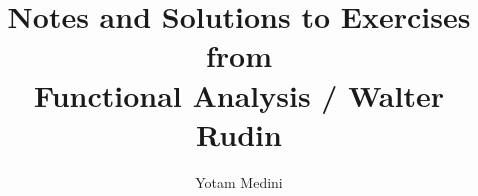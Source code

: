 \newcommand{\C}{\ensuremath{\mathbb{C}}} %
\newcommand{\calB}{\ensuremath{\mathcal{B}}}
\newcommand{\calG}{\ensuremath{\mathcal{G}}}
\newcommand{\scrD}{\ensuremath{\mathscr{D}}}
\newcommand{\scrP}{\ensuremath{\mathscr{P}}}
\newcommand{\scrQ}{\ensuremath{\mathscr{Q}}}
\newcommand{\Lp}[1]{\ensuremath{\mathbf{L}^{#1}}} %
\newcommand{\N}{\mathbb{N}} %
\newcommand{\Q}{\ensuremath{\mathbb{Q}}} %
\newcommand{\R}{\ensuremath{\mathbb{R}}} %
\newcommand{\Z}{\ensuremath{\mathbb{Z}}} %
\newcommand{\intR}{\int_{-\infty}^{\infty}} %
\newcommand{\posthat}[1]{#1{\,\hat{}\,}}

\newcommand{\seq}[2]{\ensuremath{#1_1,\ldots,#1_{#2}}}
\newcommand{\seqn}[1]{\seq{#1}{n}}
\newcommand{\seqan}{\seq{a}{n}}
\newcommand{\seqxn}{\seq{x}{n}}
\newcommand{\seqalphn}{\seq{\alpha}{n}}

\newcommand{\ich}[1]{(\textit{#1})}
\newcommand{\itemch}[1]{\item[\ich{#1}]}


\title{Notes and Solutions to Exercises \\
          from \\
       Functional Analysis / Walter Rudin}
\author{Yotam Medini}


\newtheorem{thm}{Theorem}[chapter]
\newtheorem{cor}[thm]{Corollary}
\newtheorem{Def}{Definition}
\newtheorem{lem}[thm]{Lemma}
\newtheorem{llem}[thm]{Local Lemma}
\newtheorem{lthm}[thm]{Local Theorem}

\newtheorem{quotethm}{Theorem}[chapter]


\newcommand{\proofend}{\hfill\(\blacksquare\)}
\newenvironment{thmproof}
{\textbf{Proof.}}
{\proofend}

\newcommand{\chapterTypeout}[1]{\typeout{#1} \chapter{#1}}
\newcommand{\sectionTypeout}[1]{\typeout{#1} \section{#1}}

\newcommand{\eqdef}{\ensuremath{\stackrel{\mbox{\upshape\tiny def}}{=}}}
\newcommand{\fx}{\ensuremath{f(x)}}
\newcommand{\gx}{\ensuremath{g(x)}}
\newcommand{\lrangle}[1]{\ensuremath{\langle #1 \rangle}}
\newcommand{\calD}{\ensuremath{\mathcal{D}}}
\newcommand{\frakD}{\ensuremath{\mathfrak{D}}}
\newcommand{\frakM}{\ensuremath{\mathfrak{M}}}
\newcommand{\M}{\ensuremath{\mathfrak{M}}}
\newcommand{\mldots}{\ensuremath{\ldots}}
\newcommand{\salgebra}{\(\sigma\)-algebra}
\newcommand{\wlogy}{without loss of generality}
\newcommand{\Wlogy}{Without loss of generality}
\newcommand{\unfinished}{\par\textbf{Unfinished !!!!!!!!!!!!!}\par}

